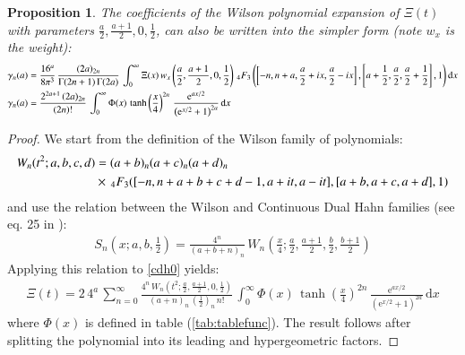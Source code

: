 \documentclass[a4paper,11pt,twoside]{amsart}
\newtheorem{proposition}[theorem]{Proposition}
\newcommand{\verifiedeq}{=}
\newcommand{\defeq}{=}
\newcommand{\verifiedeq}{\stackrel{\checkmark}{=}}
\newcommand{\defeq}{\stackrel{\scriptscriptstyle \textnormal{def}}{=}}
\begin{document}
\begin{proposition}
The coefficients of the Wilson polynomial expansion of $\Xi(t)$ with parameters $\frac{a}{2},\frac{a+1}{2},0,\frac12$, can also be written into the simpler form (note $w_x$ is the weight):   
\begin{align}
 \gamma_n(a) &\verifiedeq\frac{16^a}{8\pi^3}\,\frac{(2a)_{2n}}{\Gamma(2n+1)\,\Gamma(2a)}\,\int_{0}^\infty \Xi(x)\,w_x\left(\frac{a}{2},\frac{a+1}{2},0,\frac12\right) \,{}_4F_3\left(\left[-n,n+a,\frac{a}{2}+ix, \frac{a}{2}-ix\right],\left[a+\frac12,\frac{a}{2},\frac{a}{2}+\frac12\right],1\right) \mathrm{d}x \\
 \gamma_n(a) &\verifiedeq\frac{2^{2a+1}\,(2a)_{2n}}{(2n)!}\,\int_{0}^\infty \Phi(x)\,\tanh\left(\frac{x}{4}\right)^{2n}\,\frac{\mathrm{e}^{ax/2}}{\left(\mathrm{e}^{x/2}+1\right)^{2a}} \, \mathrm{d}x \notag
\end{align}
\end{proposition}
\begin{proof}
We start from the definition of the Wilson family of polynomials:
\begin{align}
 W_n(t^2;a,b,c,d) &\defeq (a+b)_n(a+c)_n(a+d)_n\, \\
  &\times\, {}_4F_3([-n, n+ a+b+c+d-1,a+it, a- it], [a+b, a+c, a+d], 1) \notag
\end{align}
and use the relation between the Wilson and Continuous Dual Hahn families (see eq. 25 in \cite{koesup}):
\begin{align}
 S_n\left(x;a,b,\frac12\right) \verifiedeq \frac{4^n}{(a+b+n)_n}\, W_n\left(\frac{x}{4};\frac{a}{2},\frac{a+1}{2},\frac{b}{2},\frac{b+1}{2}\right)
\end{align}
Applying this relation to \ref{cdh0} yields:
\begin{align}
  \Xi(t)\verifiedeq 2\,4^a\,\sum_{n=0}^\infty \frac{4^n\,W_n\left(t^2;\frac{a}{2},\frac{a+1}{2},0,\frac12\right)}{(a+n)_n\,\left(\frac12\right)_n\,n!}\,\int_{0}^{\infty} \Phi(x)\,\tanh\left(\frac{x}{4}\right)^{2n}\,\frac{\mathrm{e}^{ax/2}}{(\mathrm{e}^{x/2}+1)^{2a}}\,\mathrm{d}x
\end{align}
where $\Phi(x)$ is defined in table (\ref{tab:tablefunc}). The result follows after splitting the polynomial into its leading and hypergeometric factors.
\end{proof}
\end{document}
